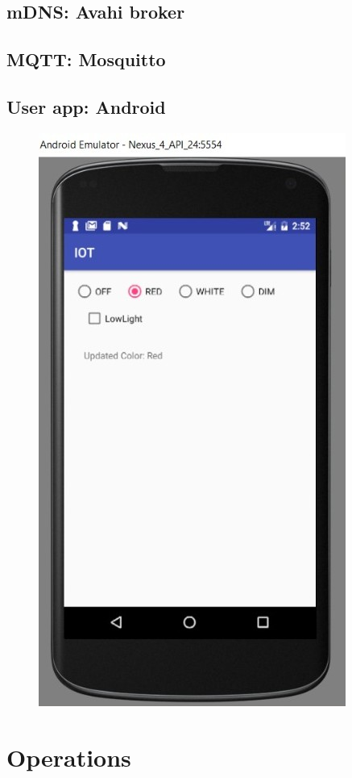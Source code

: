 \documentclass[conference]{IEEEtran}
\begin{document}
\subsection{mDNS: Avahi broker}
\subsection{MQTT: Mosquitto}
\subsection{User app: Android}

\begin{figure}[h]
	\begin{center}
		\includegraphics[width=.7\linewidth]{img/androidapp}
		\caption{}
		\label{fig:fig3}
	\end{center}
\end{figure}


\section{Operations}
\end{document}
